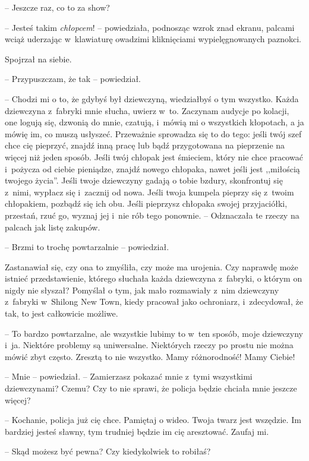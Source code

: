 \documentclass[oneside,polish,11pt,rmheadings]{mwbk}
\begin{document}
-- Jeszcze raz, co to za show? 

-- Jesteś takim \textit{chłopcem}! -- powiedziała, podnosząc wzrok znad ekranu, palcami wciąż uderzając w~klawiaturę owadzimi kliknięciami wypielęgnowanych paznokci.

Spojrzał na siebie. 

-- Przypuszczam, że tak -- powiedział.

-- Chodzi mi o to, że gdybyś był dziewczyną, wiedziałbyś o tym wszystko. Każda dziewczyna z~fabryki mnie słucha, uwierz w~to. Zaczynam audycje po kolacji, one logują się, dzwonią do mnie, czatują, i~mówią mi o wszystkich kłopotach, a ja mówię im, co muszą usłyszeć. Przeważnie sprowadza się to do tego: jeśli twój szef chce cię pieprzyć, znajdź inną pracę lub bądź przygotowana na pieprzenie na więcej niż jeden sposób. Jeśli twój chłopak jest śmieciem, który nie chce pracować i~pożycza od ciebie pieniądze, znajdź nowego chłopaka, nawet jeśli jest ,,miłością twojego życia''. Jeśli twoje dziewczyny gadają o tobie bzdury, skonfrontuj się z~nimi, wypłacz się i~zacznij od nowa. Jeśli twoja kumpela pieprzy się z~twoim chłopakiem, pozbądź się ich obu. Jeśli pieprzysz chłopaka swojej przyjaciółki, przestań, rzuć go, wyznaj jej i~nie rób tego ponownie. -- Odznaczała te rzeczy na palcach jak listę zakupów.

-- Brzmi to trochę powtarzalnie -- powiedział. 

Zastanawiał się, czy ona to zmyśliła, czy może ma urojenia. Czy naprawdę może istnieć przedstawienie, którego słuchała każda dziewczyna z~fabryki, o którym on nigdy nie słyszał? Pomyślał o tym, jak mało rozmawiały z~nim dziewczyny z~fabryki w~Shilong New Town, kiedy pracował jako ochroniarz, i~zdecydował, że tak, to jest całkowicie możliwe.

-- To bardzo powtarzalne, ale wszystkie lubimy to w~ten sposób, moje dziewczyny i~ja. Niektóre problemy są uniwersalne. Niektórych rzeczy po prostu nie można mówić zbyt często. Zresztą to nie wszystko. Mamy różnorodność! Mamy Ciebie!

-- Mnie -- powiedział. -- Zamierzasz pokazać mnie z~tymi wszystkimi dziewczynami? Czemu? Czy to nie sprawi, że policja będzie chciała mnie jeszcze więcej?

-- Kochanie, policja już cię chce. Pamiętaj o wideo. Twoja twarz jest wszędzie. Im bardziej jesteś sławny, tym trudniej będzie im cię aresztować. Zaufaj mi.

-- Skąd możesz być pewna? Czy kiedykolwiek to robiłaś?
\end{document}
